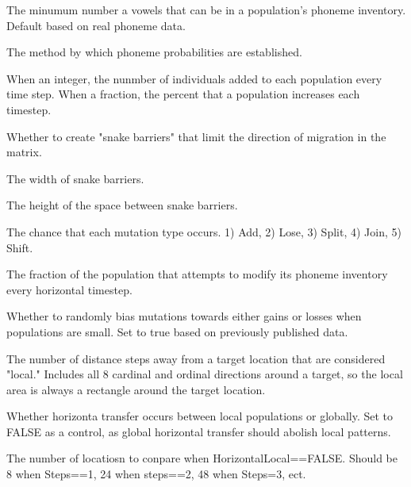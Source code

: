 \documentclass[a4paper]{book}
\begin{document}
\begin{Arguments}
\begin{ldescription}
\item[\code{MinVowel}] The minumum number a vowels that can be in a population's phoneme inventory. Default based on real phoneme data.

\item[\code{PhonemeProbabilityType}] The method by which phoneme probabilities are established.

\item[\code{GrowthRate}] When an integer, the nunmber of individuals added to each population every time step.  When a fraction, the percent that a population increases each timestep.

\item[\code{Barriers}] Whether to create "snake barriers" that limit the direction of migration in the matrix.

\item[\code{BarrierLength}] The width of snake barriers.

\item[\code{BarrierBreaks}] The height of the space between snake barriers.

\item[\code{MutationTypeChance}] The chance that each mutation type occurs.  1) Add, 2) Lose, 3) Split, 4) Join, 5) Shift.

\item[\code{HorizontalRate}] The fraction of the population that attempts to modify its phoneme inventory every horizontal timestep.

\item[\code{Bias}] Whether to randomly bias mutations towards either  gains or losses when populations are small.  Set to true based on previously published data.

\item[\code{Steps}] The number of distance steps away from a target location that are considered "local."  Includes all 8 cardinal and ordinal directions around a target, so the local area is always a rectangle around the target location.

\item[\code{HorizontalLocal}] Whether horizonta transfer occurs between local populations or globally.  Set to FALSE as a control, as global horizontal transfer should abolish local patterns.

\item[\code{NumberRandomHorizontal}] The number of locatiosn to conpare when HorizontalLocal==FALSE.  Should be 8 when Steps==1, 24 when steps==2, 48 when Steps=3, ect.


\end{ldescription}
\end{Arguments}
\end{document}
